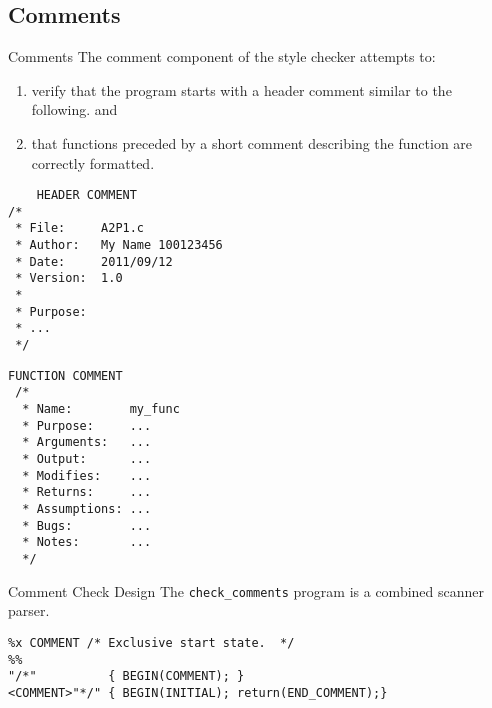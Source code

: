 \documentclass[compress]{beamer}
\begin{document}
\subsection{Comments}
\begin{frame}[containsverbatim]{Comments}
The comment component of the style checker attempts to:
\begin{enumerate}
    \item verify that the program starts with a header comment similar to the following. and 
    \item that functions preceded by a short comment describing the function are correctly formatted.
    \end{enumerate}
\begin{multicols}{2}
\scriptsize{\begin{verbatim}
    HEADER COMMENT 
/*   
 * File:     A2P1.c
 * Author:   My Name 100123456  
 * Date:     2011/09/12  
 * Version:  1.0
 * 
 * Purpose: 
 * ...
 */ 
\end{verbatim}}
\scriptsize{\begin{verbatim}
FUNCTION COMMENT
 /*
  * Name:        my_func
  * Purpose:     ...
  * Arguments:   ...
  * Output:      ...
  * Modifies:    ...
  * Returns:     ...
  * Assumptions: ...
  * Bugs:        ...
  * Notes:       ...
  */
\end{verbatim}}
\end{multicols}
\end{frame}
\begin{frame}[containsverbatim]{Comment Check Design}
The \textcolor{hsrmSec2}{\texttt{check\_comments}} program is a combined scanner parser.
\begin{verbatim}
%x COMMENT /* Exclusive start state.  */
%%
"/*"          { BEGIN(COMMENT); }
<COMMENT>"*/" { BEGIN(INITIAL); return(END_COMMENT);}

\end{verbatim}
\end{frame}

\end{document}
